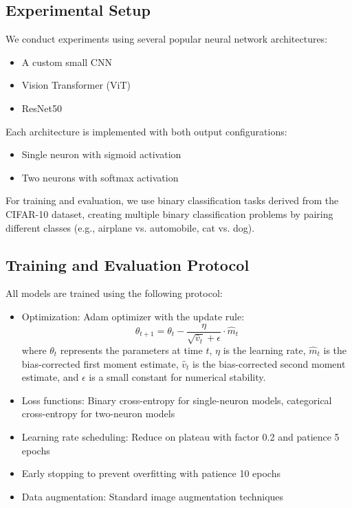 \documentclass[11pt]{article}
\begin{document}
\subsection{Experimental Setup}
We conduct experiments using several popular neural network architectures:
\begin{itemize}
\item A custom small CNN
\item Vision Transformer (ViT)
\item ResNet50
\end{itemize}

Each architecture is implemented with both output configurations:
\begin{itemize}
\item Single neuron with sigmoid activation
\item Two neurons with softmax activation
\end{itemize}

For training and evaluation, we use binary classification tasks derived from the CIFAR-10 dataset, creating multiple binary classification problems by pairing different classes (e.g., airplane vs. automobile, cat vs. dog).

\subsection{Training and Evaluation Protocol}
All models are trained using the following protocol:
\begin{itemize}
\item Optimization: Adam optimizer with the update rule:
\begin{equation}
\theta_{t+1} = \theta_t - \frac{\eta}{\sqrt{\hat{v}_t} + \epsilon} \cdot \hat{m}_t
\end{equation}
where $\theta_t$ represents the parameters at time $t$, $\eta$ is the learning rate, $\hat{m}_t$ is the bias-corrected first moment estimate, $\hat{v}_t$ is the bias-corrected second moment estimate, and $\epsilon$ is a small constant for numerical stability.

\item Loss functions: Binary cross-entropy for single-neuron models, categorical cross-entropy for two-neuron models
\item Learning rate scheduling: Reduce on plateau with factor 0.2 and patience 5 epochs
\item Early stopping to prevent overfitting with patience 10 epochs
\item Data augmentation: Standard image augmentation techniques
\end{itemize}
\end{document}
